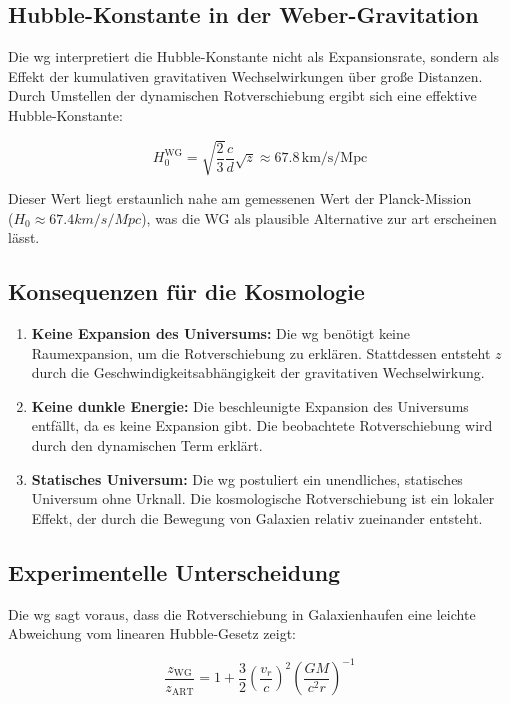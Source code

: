 \subsection{Hubble-Konstante in der Weber-Gravitation}
Die \gls{wg} interpretiert die Hubble-Konstante nicht als Expansionsrate, sondern als Effekt der kumulativen gravitativen Wechselwirkungen über große Distanzen. Durch Umstellen
der dynamischen Rotverschiebung ergibt sich eine effektive Hubble-Konstante:

\begin{equation}
    H_0^{\text{WG}} = \sqrt{\frac{2}{3}} \frac{c}{d} \sqrt{z} \approx 67.8 \, \text{km/s/Mpc}
\end{equation}

Dieser Wert liegt erstaunlich nahe am gemessenen Wert der Planck-Mission\\($H_0 \approx 67.4 km/s/Mpc$), was die WG als plausible Alternative zur \gls{art} erscheinen lässt.

\subsection{Konsequenzen für die Kosmologie}
\begin{enumerate}
    \item \textbf{Keine Expansion des Universums:} Die \gls{wg} benötigt keine Raumexpansion, um die Rotverschiebung zu erklären. Stattdessen entsteht $z$ durch die Geschwindigkeitsabhängigkeit der gravitativen Wechselwirkung.
    \item \textbf{Keine dunkle Energie:} Die beschleunigte Expansion des Universums entfällt, da es keine Expansion gibt. Die beobachtete Rotverschiebung wird durch den dynamischen Term erklärt.
    \item \textbf{Statisches Universum:} Die \gls{wg} postuliert ein unendliches, statisches Universum ohne Urknall. Die kosmologische Rotverschiebung ist ein lokaler Effekt, der durch die Bewegung von Galaxien relativ zueinander entsteht.
\end{enumerate}

\subsection{Experimentelle Unterscheidung}
Die \gls{wg} sagt voraus, dass die Rotverschiebung in Galaxienhaufen eine leichte Abweichung vom linearen Hubble-Gesetz zeigt:

\begin{equation}
    \frac{z_{\text{WG}}}{z_{\text{ART}}} = 1 + \frac{3}{2} \left( \frac{v_r}{c} \right)^2 \left( \frac{GM}{c^2 r} \right)^{-1}
\end{equation}

